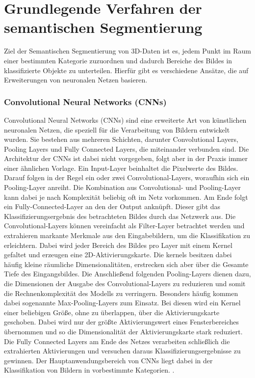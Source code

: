 \chapter{Grundlegende Verfahren der semantischen Segmentierung}

Ziel der Semantischen Segmentierung von 3D-Daten ist es, jedem Punkt im Raum
einer bestimmten Kategorie zuzuordnen und dadurch Bereiche des Bildes in
klassifizierte Objekte zu unterteilen. Hierfür gibt es verschiedene Ansätze,
die auf Erweiterungen von neuronalen Netzen basieren.

\subsection{Convolutional Neural Networks (CNNs)}
Convolutional Neural Networks (CNNs) sind eine erweiterte Art von künstlichen
neuronalen Netzen, die speziell für die Verarbeitung von Bildern entwickelt
wurden. Sie bestehen aus mehreren Schichten, darunter Convolutional Layers,
Pooling Layers und Fully Connected Layers, die miteinander verbunden sind. Die
Architektur der CNNs ist dabei nicht vorgegeben, folgt aber in der Praxis immer
einer ähnlichen Vorlage. Ein Input-Layer beinhaltet die Pixelwerte des Bildes.
Darauf folgen in der Regel ein oder zwei Convolutional-Layers, woraufhin sich
ein Pooling-Layer anreiht. Die Kombination aus Convolutional- und Pooling-Layer
kann dabei je nach Komplexität beliebig oft im Netz vorkommen. Am Ende folgt
ein Fully-Connected-Layer an den der Output anknüpft. Dieser gibt das
Klassifizierungsergebnis des betrachteten Bildes durch das Netzwerk aus. Die
Convolutional-Layers können vereinfacht als Filter-Layer betrachtet werden und
extrahieren markante Merkmale aus den Eingabebildern, um die Klassifikation zu
erleichtern. Dabei wird jeder Bereich des Bildes pro Layer mit einem Kernel
gefaltet und erzeugen eine 2D-Aktivierungskarte. Die kernels besitzen dabei
häufig kleine räumliche Dimensionalitäten, erstrecken sich aber über die
Gesamte Tiefe des Eingangsbildes. Die Anschließend folgenden Pooling-Layers
dienen dazu, die Dimensionen der Ausgabe des Convolutional-Layers zu reduzieren
und somit die Rechnenkomplexität des Modells zu verringern. Besonders häufig
kommen dabei sogenannte Max-Pooling-Layers zum Einsatz. Bei diesen wird ein
Kernel einer beliebigen Größe, ohne zu überlappen, über die Aktivierungskarte
geschoben. Dabei wird nur der größte Aktivierungswert eines Fensterbereiches
übernommen und so die Dimensionalität der Aktivierungskarte stark reduziert.
Die Fully Connected Layers am Ende des Netzes verarbeiten schließlich die
extrahierten Aktivierungen und versuchen daraus Klassifizierungsergebnisse zu
gewinnen. Der Hauptanwendungsbereich von CNNs liegt dabei in der Klassifikation
von Bildern in vorbestimmte Kategorien. \cite{11262015}.

